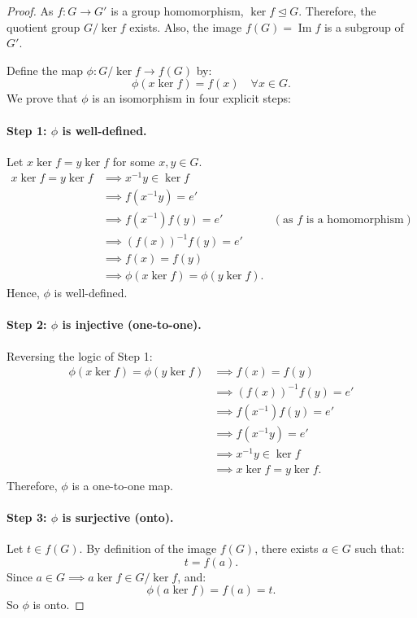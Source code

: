 \documentclass[12pt]{article}
\theoremstyle{definition}
\theoremstyle{plain}
\begin{document}
\begin{proof}
As $f: G \to G'$ is a group homomorphism, $\ker f \trianglelefteq G$.
Therefore, the quotient group $G/\ker f$ exists.
Also, the image $f(G) = \operatorname{Im} f$ is a subgroup of $G'$.

Define the map $\phi: G/\ker f \to f(G)$ by:
\[
\phi(x\ker f) = f(x) \quad \forall x \in G.
\]
We prove that $\phi$ is an isomorphism in four explicit steps:

\paragraph{Step 1: $\phi$ is well-defined.}
Let $x\ker f = y\ker f$ for some $x, y \in G$.
\begin{align*}
x\ker f = y\ker f &\implies x^{-1}y \in \ker f \\
&\implies f(x^{-1}y) = e' \\
&\implies f(x^{-1}) f(y) = e' & (\text{as } f \text{ is a homomorphism}) \\
&\implies (f(x))^{-1} f(y) = e' \\
&\implies f(x) = f(y) \\
&\implies \phi(x\ker f) = \phi(y\ker f).
\end{align*}
Hence, $\phi$ is well-defined.

\paragraph{Step 2: $\phi$ is injective (one-to-one).}
Reversing the logic of Step 1:
\begin{align*}
\phi(x\ker f) = \phi(y\ker f) &\implies f(x) = f(y) \\
&\implies (f(x))^{-1} f(y) = e' \\
&\implies f(x^{-1}) f(y) = e' \\
&\implies f(x^{-1}y) = e' \\
&\implies x^{-1}y \in \ker f \\
&\implies x\ker f = y\ker f.
\end{align*}
Therefore, $\phi$ is a one-to-one map.

\paragraph{Step 3: $\phi$ is surjective (onto).}
Let $t \in f(G)$.
By definition of the image $f(G)$, there exists $a \in G$ such that:
\[
t = f(a).
\]
Since $a \in G \implies a\ker f \in G/\ker f$, and:
\[
\phi(a\ker f) = f(a) = t.
\]
So $\phi$ is onto.


\end{proof}
\end{document}
